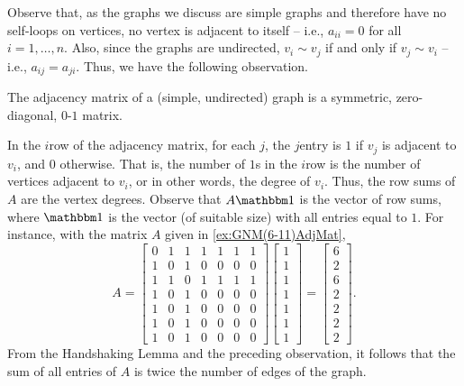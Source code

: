 Observe that, as the graphs we discuss are simple graphs and therefore have no self-loops on vertices, no vertex is adjacent to itself -- i.e., $a_{ii} = 0$ for all $i = 1, \ldots, n$. Also, since the graphs are undirected, $v_i \sim v_j$ if and only if $v_j \sim v_i$ -- i.e., $a_{ij} = a_{ji}$. Thus, we have the following observation.

\begin{Observation}
The adjacency matrix of a (simple, undirected) graph is a symmetric, zero-diagonal, $0$-$1$ matrix.
\end{Observation}

In the $i$\nth row of the adjacency matrix, for each $j$, the $j$\nth entry is $1$ if $v_j$ is adjacent to $v_i$, and $0$ otherwise. That is, the number of $1$s in the $i$\nth row is the number of vertices adjacent to $v_i$, or in other words, the degree of $v_i$. Thus, the row sums of $A$ are the vertex degrees. Observe that $A \mathbbm 1$ is the vector of row sums, where $\mathbbm 1$ is the vector (of suitable size) with all entries equal to $1$. For instance, with the matrix $A$ given in \cref{ex:GNM(6-11)AdjMat},
\begin{equation*}
A = \begin{bmatrix}
0 & 1 & 1 & 1 & 1 & 1 & 1 \\
1 & 0 & 1 & 0 & 0 & 0 & 0 \\
1 & 1 & 0 & 1 & 1 & 1 & 1 \\
1 & 0 & 1 & 0 & 0 & 0 & 0 \\
1 & 0 & 1 & 0 & 0 & 0 & 0 \\
1 & 0 & 1 & 0 & 0 & 0 & 0 \\
1 & 0 & 1 & 0 & 0 & 0 & 0
\end{bmatrix}
\begin{bmatrix}
1 \\ 1 \\ 1 \\ 1 \\ 1 \\ 1 \\ 1
\end{bmatrix} =
\begin{bmatrix}
6 \\ 2 \\ 6 \\ 2 \\ 2 \\ 2 \\ 2
\end{bmatrix}.
\end{equation*}
From the Handshaking Lemma and the preceding observation, it follows that the sum of all entries of $A$ is twice the number of edges of the graph.

